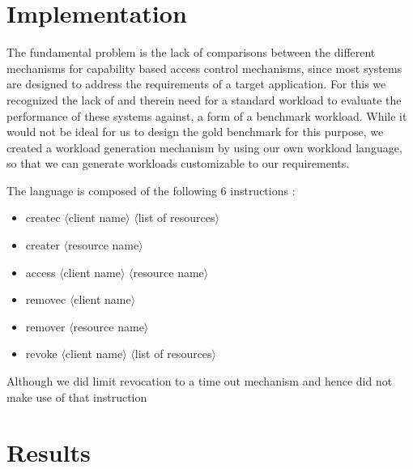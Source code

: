 \section{Implementation}
\label{sec:implementation}

The fundamental problem is the lack of comparisons between the different mechanisms for capability based access control mechanisms, since most systems are designed to address the requirements of a target application. For this we recognized the lack of and therein need for a standard workload to evaluate the performance of these systems against, a form of a benchmark workload. While it would not be ideal for us to design the gold benchmark for this purpose, we created a workload generation mechanism by using our own workload language, so that we can generate workloads customizable to our requirements.

The language is composed of the following 6 instructions :
\begin{itemize}
\item createc $\langle$client name$\rangle$ $\langle$list of resources$\rangle$
\item creater $\langle$resource name$\rangle$
\item access $\langle$client name$\rangle$ $\langle$resource name$\rangle$
\item removec $\langle$client name$\rangle$
\item remover $\langle$resource name$\rangle$
\item revoke $\langle$client name$\rangle$ $\langle$list of resources$\rangle$
\end{itemize}   
Although we did limit revocation to a time out mechanism and hence did not make use of that instruction

\section{Results}
\label{sec:results}